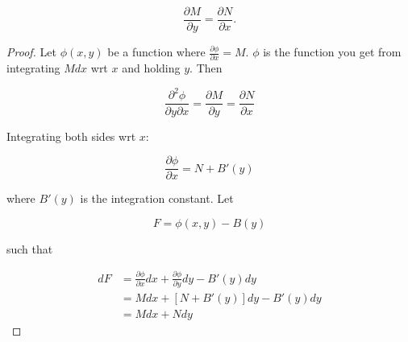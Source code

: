 \begin{definition}[Exactness]
    \begin{equation}
        \frac{\partial M}{\partial y}=\frac{\partial N}{\partial x}.
    \end{equation}
\end{definition}

\begin{proof}
    Let $\phi(x,y)$ be a function where $\frac{\partial \phi}{\partial x}=M$. $\phi$ is the function you get from integrating $Mdx$ wrt $x$ and holding $y$. Then

    \begin{equation}
        \frac{\partial^2\phi}{\partial y\partial x}=\frac{\partial M}{\partial y}=\frac{\partial N}{\partial x}
    \end{equation}

    Integrating both sides wrt $x$:

    \begin{equation}
        \frac{\partial \phi}{\partial x}=N+B'(y)
    \end{equation}

    where $B'(y)$ is the integration constant. Let

    \begin{equation}
        F=\phi(x,y)-B(y)
    \end{equation}

    such that 

    \begin{align}
        dF&=\frac{\partial \phi}{\partial x}dx+\frac{\partial \phi}{\partial y}dy-B'(y)dy\\
        &=Mdx+\left[N+B'(y)\right]dy-B'(y)dy\\
        &=Mdx+Ndy
    \end{align}
\end{proof}

